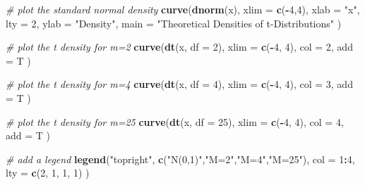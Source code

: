 \documentclass[]{book}
\newenvironment{Shaded}{\begin{snugshade}}{\end{snugshade}}
\newcommand{\KeywordTok}[1]{\textcolor[rgb]{0.13,0.29,0.53}{\textbf{#1}}}
\newcommand{\DataTypeTok}[1]{\textcolor[rgb]{0.13,0.29,0.53}{#1}}
\newcommand{\DecValTok}[1]{\textcolor[rgb]{0.00,0.00,0.81}{#1}}
\newcommand{\StringTok}[1]{\textcolor[rgb]{0.31,0.60,0.02}{#1}}
\newcommand{\CommentTok}[1]{\textcolor[rgb]{0.56,0.35,0.01}{\textit{#1}}}
\newcommand{\OperatorTok}[1]{\textcolor[rgb]{0.81,0.36,0.00}{\textbf{#1}}}
\newcommand{\NormalTok}[1]{#1}
\theoremstyle{definition}
\theoremstyle{definition}
\theoremstyle{definition}
\theoremstyle{remark}
\begin{document}
\begin{Shaded}
\begin{Highlighting}[]
\CommentTok{# plot the standard normal density}
\KeywordTok{curve}\NormalTok{(}\KeywordTok{dnorm}\NormalTok{(x), }
      \DataTypeTok{xlim =} \KeywordTok{c}\NormalTok{(}\OperatorTok{-}\DecValTok{4}\NormalTok{,}\DecValTok{4}\NormalTok{), }
      \DataTypeTok{xlab =} \StringTok{"x"}\NormalTok{, }
      \DataTypeTok{lty =} \DecValTok{2}\NormalTok{, }
      \DataTypeTok{ylab =} \StringTok{"Density"}\NormalTok{, }
      \DataTypeTok{main =} \StringTok{"Theoretical Densities of t-Distributions"}
\NormalTok{      )}

\CommentTok{# plot the t density for m=2}
\KeywordTok{curve}\NormalTok{(}\KeywordTok{dt}\NormalTok{(x, }\DataTypeTok{df =} \DecValTok{2}\NormalTok{), }
      \DataTypeTok{xlim =} \KeywordTok{c}\NormalTok{(}\OperatorTok{-}\DecValTok{4}\NormalTok{, }\DecValTok{4}\NormalTok{), }
      \DataTypeTok{col =} \DecValTok{2}\NormalTok{, }
      \DataTypeTok{add =}\NormalTok{ T}
\NormalTok{      )}

\CommentTok{# plot the t density for m=4}
\KeywordTok{curve}\NormalTok{(}\KeywordTok{dt}\NormalTok{(x, }\DataTypeTok{df =} \DecValTok{4}\NormalTok{), }
      \DataTypeTok{xlim =} \KeywordTok{c}\NormalTok{(}\OperatorTok{-}\DecValTok{4}\NormalTok{, }\DecValTok{4}\NormalTok{), }
      \DataTypeTok{col =} \DecValTok{3}\NormalTok{, }
      \DataTypeTok{add =}\NormalTok{ T}
\NormalTok{      )}

\CommentTok{# plot the t density for m=25}
\KeywordTok{curve}\NormalTok{(}\KeywordTok{dt}\NormalTok{(x, }\DataTypeTok{df =} \DecValTok{25}\NormalTok{), }
      \DataTypeTok{xlim =} \KeywordTok{c}\NormalTok{(}\OperatorTok{-}\DecValTok{4}\NormalTok{, }\DecValTok{4}\NormalTok{), }
      \DataTypeTok{col =} \DecValTok{4}\NormalTok{, }
      \DataTypeTok{add =}\NormalTok{ T}
\NormalTok{      )}

\CommentTok{# add a legend}
\KeywordTok{legend}\NormalTok{(}\StringTok{"topright"}\NormalTok{, }
       \KeywordTok{c}\NormalTok{(}\StringTok{"N(0,1)"}\NormalTok{,}\StringTok{"M=2"}\NormalTok{,}\StringTok{"M=4"}\NormalTok{,}\StringTok{"M=25"}\NormalTok{), }
       \DataTypeTok{col =} \DecValTok{1}\OperatorTok{:}\DecValTok{4}\NormalTok{, }
       \DataTypeTok{lty =} \KeywordTok{c}\NormalTok{(}\DecValTok{2}\NormalTok{, }\DecValTok{1}\NormalTok{, }\DecValTok{1}\NormalTok{, }\DecValTok{1}\NormalTok{)}
\NormalTok{       )}
\end{Highlighting}
\end{Shaded}
\end{document}
